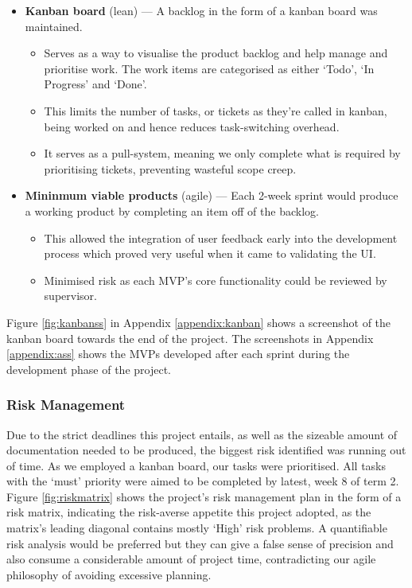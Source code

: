 \documentclass[12pt, a4paper]{article}
\begin{document}
\begin{itemize}
    \item \textbf{Kanban board} (lean) --- A backlog in the form of a kanban board was maintained.
    \begin{itemize}
        \item Serves as a way to visualise the product backlog and help manage and prioritise work. The work items are categorised as either `Todo', `In Progress' and `Done'.
        \item This limits the number of tasks, or tickets as they're called in kanban, being worked on and hence reduces task-switching overhead.
        \item It serves as a pull-system, meaning we only complete what is required by prioritising tickets, preventing wasteful scope creep.
    \end{itemize}

    \item \textbf{Mininmum viable products} (agile) --- Each 2-week sprint would produce a working product by completing an item off of the backlog.
    \begin{itemize}
        \item This allowed the integration of user feedback early into the development process which proved very useful when it came to validating the UI.

        \item Minimised risk as each MVP's core functionality could be reviewed by supervisor.
    \end{itemize}

\end{itemize}

Figure \ref{fig:kanbanss} in Appendix \ref{appendix:kanban} shows a screenshot of the kanban board towards the end of the project. The screenshots in Appendix \ref{appendix:ass} shows the MVPs developed after each sprint during the development phase of the project.

\subsubsection{Risk Management}

Due to the strict deadlines this project entails, as well as the sizeable amount of documentation needed to be produced, the biggest risk identified was running out of time. As we employed a kanban board, our tasks were prioritised. All tasks with the `must' priority were aimed to be completed by latest, week 8 of term 2. Figure \ref{fig:riskmatrix} shows the project's risk management plan in the form of a risk matrix, indicating the risk-averse appetite this project adopted, as the matrix's leading diagonal contains mostly `High' risk problems. A quantifiable risk analysis would be preferred but they can give a false sense of precision \citep{raftery2003risk} and also consume a considerable amount of project time, contradicting our agile philosophy of avoiding excessive planning.
\end{document}
